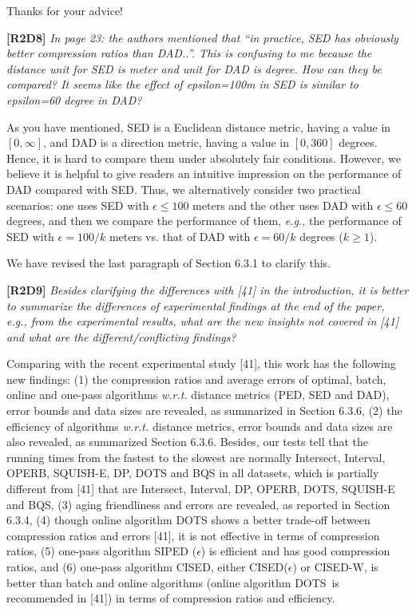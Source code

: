 \documentclass{letter}
\newcommand{\eg}{\emph{e.g.,}\xspace}
\newcommand{\wrt}{\emph{w.r.t.}\xspace}
\begin{document}
Thanks for your advice!


\textbf{[R2D8]} \emph{In page 23: the authors mentioned that ``in practice, SED has obviously better compression ratios than DAD..''. This is confusing to me because the distance unit for SED is meter and unit for DAD is degree. How can they be compared? It seems like the effect of epsilon=100m in SED is similar to epsilon=60 degree in DAD?}

As you have mentioned, SED is a Euclidean distance metric, having a value in $[0, \infty]$, and DAD is a direction metric, having a value in $[0, 360]$ degrees. Hence, it is hard to compare them under absolutely fair conditions. However, we believe it is helpful to give readers an intuitive impression on the performance of DAD compared with SED. Thus, we alternatively consider two practical scenarios: one uses SED with $\epsilon  \le  100$ meters and the other uses DAD with $\epsilon \le 60$ degrees, and then we compare the performance of them, \eg the performance of SED with $\epsilon=100/k$ meters vs. that of DAD with $\epsilon=60/k$ degrees ($k\ge 1$).


{We have revised the last paragraph of Section 6.3.1 to clarify this. }

\textbf{[R2D9]} \emph{Besides clarifying the differences with [41] in the introduction, it is better to summarize the differences of experimental findings at the end of the paper, e.g., from the experimental results, what are the new insights not covered in [41] and what are the different/conflicting findings?}

Comparing with the recent experimental study [41], this work has the following new findings:
(1) the compression ratios and average errors of optimal, batch, online and one-pass algorithms \wrt distance metrics (PED, SED and DAD), error bounds and data sizes are revealed, as summarized in Section 6.3.6,
(2) the efficiency of algorithms \wrt distance metrics, error bounds and data sizes are also revealed, as summarized Section 6.3.6. Besides, our tests tell that the running times from the fastest to the slowest are normally Intersect, Interval, OPERB, SQUISH-E, DP, DOTS and BQS in all datasets, which is partially different from [41] that are Intersect, Interval, DP, OPERB, DOTS, SQUISH-E and BQS,
(3) aging friendliness and errors are revealed, as reported in Section 6.3.4,
(4) though online algorithm DOTS shows a better trade-off between compression ratios and errors [41], it is not effective in terms of compression ratios,
(5) one-pass algorithm SIPED ($\epsilon$) is efficient and has good compression ratios, and
(6) one-pass algorithm CISED, either CISED($\epsilon$) or CISED-W, is better than batch and online algorithms (online algorithm DOTS~is recommended in [41]) in terms of compression ratios and efficiency.
\end{document}
